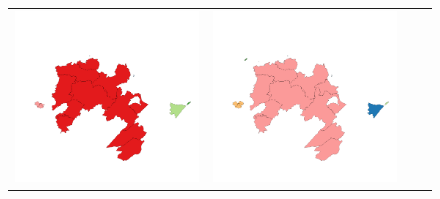 \begin{figure}[p]
\begin{tabularx}{1\textwidth}{XXXX}
\includegraphics[width=1\linewidth]{images/ch6/contig/09}&
\includegraphics[width=1\linewidth]{images/ch6/contig/10}&

\end{tabularx}
\end{figure}
